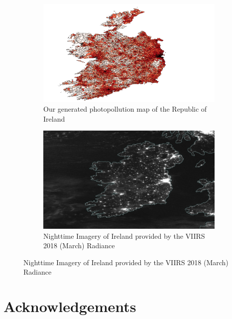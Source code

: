 \documentclass[12pt]{titlepage}
\begin{document}
\begin{figure}[h]
    \centering
    \caption{Our generated photopollution map compared against the VIIRS 2018 (March) Radiance}
    \begin{subfigure}{.49\textwidth}
        \centering
        \includegraphics[width=\textwidth]{photopollutionmap}
        \caption{Our generated photopollution map of the Republic of Ireland}
        \label{a}
    \end{subfigure}
    \hfill
    \begin{subfigure}{.49\textwidth}
        \centering
        \includegraphics[width=\textwidth]{ireland}
        \caption{Nighttime Imagery of Ireland provided by the VIIRS 2018 (March) Radiance}
        \label{b}
    \end{subfigure}
\end{figure}


\chapter*{Acknowledgements}

\end{document}
